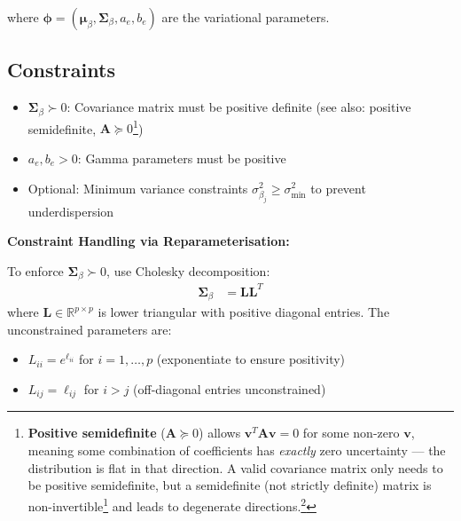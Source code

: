 \documentclass[11pt]{article}
\newcommand{\R}{\mathbb{R}}
\begin{document}
where $\bm{\phi} = (\bm{\mu}_\beta, \bm{\Sigma}_\beta, a_e, b_e)$ are the variational parameters.

\subsection*{Constraints}

\begin{itemize}
\item $\bm{\Sigma}_\beta \succ 0$: Covariance matrix must be positive definite (see also: positive semidefinite, $\bm{A} \succeq 0$\footnote{\textbf{Positive semidefinite} ($\bm{A} \succeq 0$) allows $\bm{v}^T\bm{A}\bm{v} = 0$ for some non-zero $\bm{v}$, meaning some combination of coefficients has \emph{exactly} zero uncertainty --- the distribution is flat in that direction. A valid covariance matrix only needs to be positive semidefinite, but a semidefinite (not strictly definite) matrix is non-invertible\footnote{A matrix is \textbf{invertible} if $\bm{A}^{-1}$ exists, meaning the equation $\bm{A}\bm{x}=\bm{b}$ has a unique solution for any $\bm{b}$. Equivalently: none of the eigenvalues are zero. The precision matrix $\bm{\Sigma}_\beta^{-1}$ appears in the ELBO and CAVI updates; if $\bm{\Sigma}_\beta$ is not invertible these computations fail.} and leads to degenerate directions.\footnote{A \textbf{degenerate direction} is a direction $\bm{v}$ in which the distribution has zero spread --- the posterior is completely certain that $\bm{v}^T\bm{\beta}$ takes one exact value with no uncertainty. Geometrically: the probability ellipsoid is flat (squashed to zero thickness) along $\bm{v}$. This corresponds to a zero eigenvalue and makes the covariance matrix singular (non-invertible). It usually signals numerical collapse or that the data perfectly determines some linear combination of $\bm{\beta}$.}})
\item $a_e, b_e > 0$: Gamma parameters must be positive
\item Optional: Minimum variance constraints $\sigma^2_{\beta_j} \geq \sigma^2_{\text{min}}$ to prevent underdispersion
\end{itemize}

\textbf{Constraint Handling via Reparameterisation:}

To enforce $\bm{\Sigma}_\beta \succ 0$, use Cholesky decomposition:
\begin{align}
\bm{\Sigma}_\beta &= \bm{L}\bm{L}^T
\end{align}
where $\bm{L} \in \R^{p \times p}$ is lower triangular with positive diagonal entries. The unconstrained parameters are:
\begin{itemize}
\item $L_{ii} = e^{\ell_{ii}}$ for $i=1,\ldots,p$ (exponentiate to ensure positivity)
\item $L_{ij} = \ell_{ij}$ for $i > j$ (off-diagonal entries unconstrained)
\end{itemize}
\end{document}
